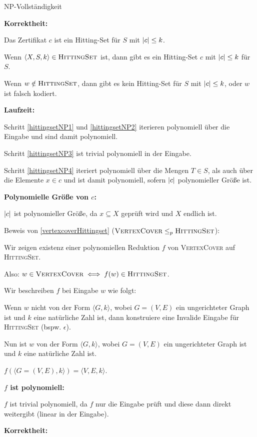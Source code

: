 \documentclass[answers]{submit}
\begin{document}
\begin{exercise}[7]{NP-Vollständigkeit}
{    \textbf{Korrektheit:}

    Das Zertifikat $c$ ist ein Hitting-Set für $S$ mit $\left\vert c \right\vert\leq k$.

    Wenn $\langle X, S, k \rangle\in\textsc{HittingSet}$ ist, dann gibt es ein Hitting-Set $c$ mit $\left\vert c \right\vert\leq k$ für $S$.

    Wenn $w\notin \textsc{HittingSet}$, dann gibt es kein Hitting-Set für $S$ mit $\left\vert c \right\vert\leq k$, oder $w$ ist falsch kodiert.

    \textbf{Laufzeit:}

    Schritt \ref{hittingsetNP1} und \ref{hittingsetNP2} iterieren polynomiell über die Eingabe und sind damit polynomiell.

    Schritt \ref{hittingsetNP3} ist trivial polynomiell in der Eingabe.

    Schritt \ref{hittingsetNP4} iteriert polynomiell über die Mengen $T\in S$, als auch über die Elemente $x\in c$ und ist damit polynomiell, sofern $\left\vert c \right\vert$ polynomieller Größe ist.

    \textbf{Polynomielle Größe von $c$:}

    $\left\vert c \right\vert$ ist polynomieller Größe, da $x\subseteq X$ geprüft wird und $X$ endlich ist.

    Beweis von \ref{vertexcoverHittingset} ($\textsc{VertexCover}\leq_p \textsc{HittingSet}$):

    Wir zeigen existenz einer polynomiellen Reduktion $f$ von \textsc{VertexCover} auf \textsc{HittingSet}.

    Also: $w\in\textsc{VertexCover}\iff f(w)\in\textsc{HittingSet}$.

    Wir beschreiben $f$ bei Eingabe $w$ wie folgt:

    Wenn $w$ nicht von der Form $\langle G, k \rangle$,
    wobei $G=(V,E)$ ein ungerichteter Graph ist
    und $k$ eine natürliche Zahl ist,
    dann konstruiere eine Invalide Eingabe für \textsc{HittingSet} (bspw. $\epsilon$).

    Nun ist $w$ von der Form $\langle G, k \rangle$,
    wobei $G=(V,E)$ ein ungerichteter Graph ist
    und $k$ eine natürliche Zahl ist.

    $f(\langle G=(V,E), k \rangle) = \langle V, E, k \rangle$.

    \textbf{$f$ ist polynomiell:}

    $f$ ist trivial polynomiell, da $f$ nur die Eingabe prüft und diese dann direkt weitergibt (linear in der Eingabe).

    \textbf{Korrektheit:}

}
\end{exercise}
\end{document}
